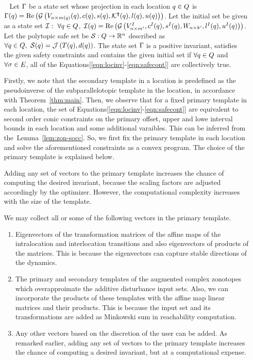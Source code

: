 \begin{theorem}~\label{thm:main} Let $\Gamma$ be a state set whose
  projection in each location $q\in Q$ is
  $\Gamma(q) = \operatorname{\operatorname{Re}}\left(\mathcal{G}\left(V_{n\times
      m(q)}(q),c(q),s(q),\mathcal{K}^{\bm{\dagger}}(q),l(q),u(q)\right)\right)$.
  Let the initial set be given as a state set
  $\mathcal{I}:~\forall q\in Q$,
  $\mathcal{I}(q)=\operatorname{\operatorname{Re}}\left(\mathcal{G}\left(V^I_{n\times m^\prime
  },c^I(q),s^I(q),W_{n\times
      k^\prime},l^I(q),u^I(q)\right)\right)$.  Let the polytopic safe set
  be $\mathcal{S}:Q\rightarrow\mathbb{R}^n$ described as $\forall
  q\in Q,~\mathcal{S}(q)=\mathcal{J}\left(T(q),d(q)\right)$.
  The state set $\Gamma$ is a positive invariant, satisfies the
  given safety constraints and contains the given initial set if
  $\forall q\in Q$ and $\forall \sigma\in E$, all of
  the Equations[\ref{eqn:locinv}-\ref{eqn:safecont}] are collectively
  true.
\end{theorem}

  Firstly, we note that the secondary
template in a location is predefined as the pseudoinverse of the
subparallelotopic template in the location, in accordance with
Theorem~\ref{thm:main}.  Then, we observe that for a fixed primary
template in each location, the set of
Equations[\ref{eqn:locinv}-\ref{eqn:safecont}] are equivalent to
second order conic constraints on the primary offset, upper and lowe
interval bounds in each location and some additional varaibles.  This
can be inferred from the~Lemma~\ref{lem:zon-socc}. So, we first fix
the primary template in each location and solve the aforementioned
constraints as a convex program.  The choice of the primary template
is explained below.

  Adding any set of vectors to
the primary template increases the chance of computing the desired
invariant, because the scaling factors are adjusted accordingly by the
optimizer.  However, the computational complexity increases with the
size of the template.

  We may collect all or some of
the following vectors in the primary template.
%
\begin{enumerate}
\item Eigenvectors of the transformation matrices of the affine maps
  of the intralocation and interlocation transitions and also
  eigenvectors of products of the matrices.  This is because the
  eigenvectors can capture stable directions of the dynamics.
\item The primary and secondary templates of the augmented complex
  zonotopes which overapproimate the additive disturbance input sets.
  Also, we can incorporate the products of these templates with the
  affine map linear matrices and their products.  This is because the
  input set and its transformations are added as Minkowski sum in
  reachability computation.
\item Any other vectors based on the discretion of the user can be
  added.  As remarked earlier, adding any set of vectors to the
  primary template increases the chance of computing a desired
  invariant, but at a computational expense.
\end{enumerate}
